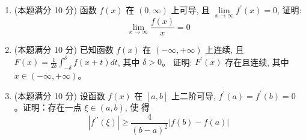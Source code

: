 \begin{enumerate}


\item 
(本题满分 10 分)
函数 $f(x)$ 在 $(0,\infty)$ 上可导, 且 $\lim\limits _{x \rightarrow \infty} f^{\prime}(x)=0$, 证明:
\[
\lim\limits _{x \rightarrow \infty} \frac{f(x)}{x}=0
\]



\item 
(本题满分 10 分)
已知函数 $f(x)$ 在 $(-\infty,+\infty)$ 上连续, 且 $F(x)=\frac{1}{2 \delta} \int_{-\delta}^{\delta} f(x+t) d t$, 其中 $\delta>0$。 证明: $F^{\prime}(x)$ 存在且连续, 其中 $x \in(-\infty,+\infty)$。




\item 
(本题满分 10 分)
设函数 $f(x)$ 在 $[a, b]$ 上二阶可导, $f^{\prime}(a)=f^{\prime}(b)=0$ 。证明：存在一点 $\xi \in(a, b)$, 使 得
\[
\left|f^{\prime \prime}(\xi)\right| \geq \frac{4}{(b-a)^{2}}|f(b)-f(a)|
\]

	
	
	
\end{enumerate}


